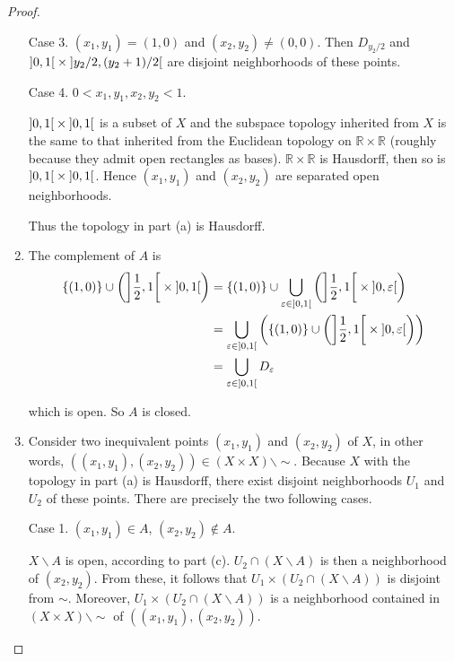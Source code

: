 \begin{proof}
\begin{enumerate}[label={(\alph*)}]
		      Case 3. $(x_{1}, y_{1}) = (1, 0)$ and $(x_{2}, y_{2}) \ne (0, 0)$. Then $D_{y_{2}/2}$ and $\left]{0, 1}\right[\times\left]{y_{2}/2, (y_{2}+1)/2}\right[$ are disjoint neighborhoods of these points.

		      Case 4. $0 < x_{1}, y_{1}, x_{2}, y_{2} < 1$.

		      $\left]{0, 1}\right[\times \left]{0, 1}\right[$ is a subset of $X$ and the subspace topology inherited from $X$ is the same to that inherited from the Euclidean topology on $\mathbb{R}\times\mathbb{R}$ (roughly because they admit open rectangles as bases). $\mathbb{R}\times\mathbb{R}$ is Hausdorff, then so is $\left]{0, 1}\right[\times \left]{0, 1}\right[$. Hence $(x_{1}, y_{1})$ and $(x_{2}, y_{2})$ are separated open neighborhoods.

		      Thus the topology in part (a) is Hausdorff.
		\item The complement of $A$ is
		      \begin{align*}
			      \left\{{(1, 0)}\right\} \cup \left( \left]{\frac{1}{2}, 1}\right[ \times \left]{0, 1}\right[ \right) & = \left\{{(1, 0)}\right\} \cup \bigcup_{\varepsilon\in\left]{0,1}\right[} \left(\left]{\frac{1}{2}, 1}\right[ \times \left]{0, \varepsilon}\right[\right)              \\
			                                                                                                & = \bigcup_{\varepsilon\in\left]{0,1}\right[} \left(\left\{{(1, 0)}\right\} \cup \left(\left]{\frac{1}{2}, 1}\right[ \times \left]{0, \varepsilon}\right[\right)\right) \\
			                                                                                                & = \bigcup_{\varepsilon\in\left]{0,1}\right[} D_{\varepsilon}
		      \end{align*}

		      which is open. So $A$ is closed.
		\item Consider two inequivalent points $(x_{1}, y_{1})$ and $(x_{2}, y_{2})$ of $X$, in other words, $\left((x_{1}, y_{1}), (x_{2}, y_{2})\right) \in (X\times X)\smallsetminus\sim$. Because $X$ with the topology in part (a) is Hausdorff, there exist disjoint neighborhoods $U_{1}$ and $U_{2}$ of these points. There are precisely the two following cases.

		      Case 1. $(x_{1}, y_{1}) \in A$, $(x_{2}, y_{2}) \notin A$.

		      $X\smallsetminus A$ is open, according to part (c). $U_{2}\cap (X\smallsetminus A)$ is then a neighborhood of $(x_{2}, y_{2})$. From these, it follows that $U_{1} \times (U_{2}\cap (X\smallsetminus A))$ is disjoint from $\sim$. Moreover, $U_{1} \times (U_{2}\cap (X\smallsetminus A))$ is a neighborhood contained in $(X\times X)\smallsetminus\sim$ of $\left((x_{1}, y_{1}), (x_{2}, y_{2})\right)$.


\end{enumerate}
\end{proof}
